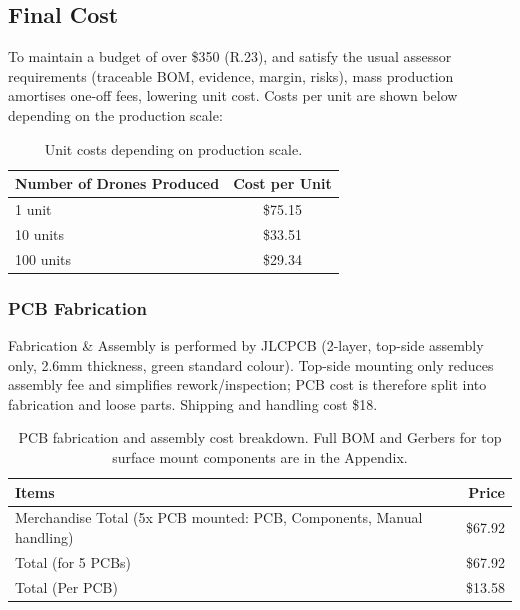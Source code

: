 
\pagebreak
\subsection{Final Cost}

To maintain a budget of over \$350 (R.23), and satisfy the usual assessor requirements (traceable BOM, evidence, margin, risks), mass production amortises one-off fees, lowering unit cost. Costs per unit are shown below depending on the production scale:

\begin{table}[H]
\centering
\begin{tabular}{l c}
\toprule
\textbf{Number of Drones Produced} & \textbf{Cost per Unit} \\
\midrule
1 unit   & \$75.15 \\
10 units & \$33.51 \\
100 units & \$29.34 \\
\bottomrule
\end{tabular}
\caption{Unit costs depending on production scale.}
\end{table}

\subsubsection{PCB Fabrication}

Fabrication \& Assembly is performed by JLCPCB (2-layer, top-side assembly only, 2.6mm thickness, green standard colour). Top-side mounting only reduces assembly fee and simplifies rework/inspection; PCB cost is therefore split into fabrication and loose parts. Shipping and handling cost \$18.

\begin{table}[H]
\centering
\begin{tabular}{l r}
\toprule
\textbf{Items} & \textbf{Price} \\
\midrule
Merchandise Total (5x PCB mounted: PCB, Components, Manual handling) & \$67.92 \\
Total (for 5 PCBs) & \$67.92 \\
Total (Per PCB) & \$13.58 \\
\bottomrule
\end{tabular}
\caption{PCB fabrication and assembly cost breakdown. Full BOM and Gerbers for top surface mount components are in the Appendix.}
\end{table}

